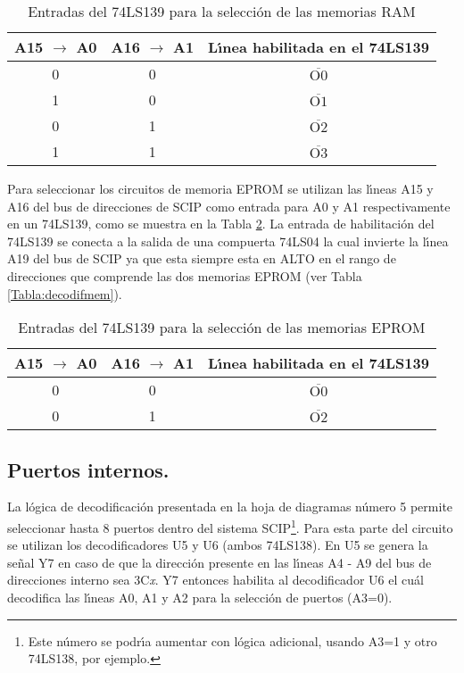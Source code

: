 \begin{table}[!htb]
\centering
\begin{tabular}{|c|c|c|} \hline
A15 $\rightarrow$ A0 & A16 $\rightarrow$ A1 & L\'{\i}nea habilitada en el 74LS139 \\ %
\hline
0 & 0 & $\overline{\mbox{O0}}$ \\
1 & 0 & $\overline{\mbox{O1}}$ \\
0 & 1 & $\overline{\mbox{O2}}$ \\
1 & 1 & $\overline{\mbox{O3}}$ \\ \hline
\end{tabular}
\caption{Entradas del 74LS139 para la selecci\'on de las memorias RAM}
\label{Tabla:decodif1}
\end{table}

Para seleccionar los circuitos de memoria EPROM se utilizan las l\'{\i}neas A15 y A16 del bus %
de direcciones de SCIP como entrada para A0 y A1 respectivamente en un 74LS139, como se muestra %
en la Tabla \ref{Tabla:decodif2}. La entrada de habilitaci\'on del 74LS139 se conecta a la %
salida de una compuerta 74LS04 la cual invierte la l\'{\i}nea A19 del bus de SCIP ya que esta %
siempre esta en ALTO en el rango de direcciones que comprende las dos memorias EPROM (ver Tabla %
\ref{Tabla:decodifmem}).

\begin{table}[!htb]
\centering
\begin{tabular}{|c|c|c|} \hline
A15 $\rightarrow$ A0 & A16 $\rightarrow$ A1 & L\'{\i}nea habilitada en el 74LS139 \\ %
\hline
0 & 0 & $\overline{\mbox{O0}}$ \\
0 & 1 & $\overline{\mbox{O2}}$  \\ \hline
\end{tabular}
\caption{Entradas del 74LS139 para la selecci\'on de las memorias EPROM}
\label{Tabla:decodif2}
\end{table}


\subsection{Puertos internos.}
\label{Subseccion:internalports}

La l\'ogica de decodificaci\'on presentada en la hoja de diagramas n\'umero 5 permite %
seleccionar hasta 8 puertos dentro del sistema SCIP\footnote{Este n\'umero se podr\'{\i}a %
aumentar con l\'ogica adicional, usando A3=1 y otro 74LS138, por ejemplo.}. Para esta parte del %
circuito se utilizan los decodificadores U5 y U6 (ambos 74LS138). En U5 se genera la se\~nal Y7 %
en caso de que la direcci\'on presente en las l\'{\i}neas A4 - A9 del bus de direcciones %
interno sea 3C{\it x\/}. Y7 entonces habilita al decodificador U6 el cu\'al decodifica las %
l\'{\i}neas A0, A1 y A2 para la selecci\'on de puertos (A3=0).

